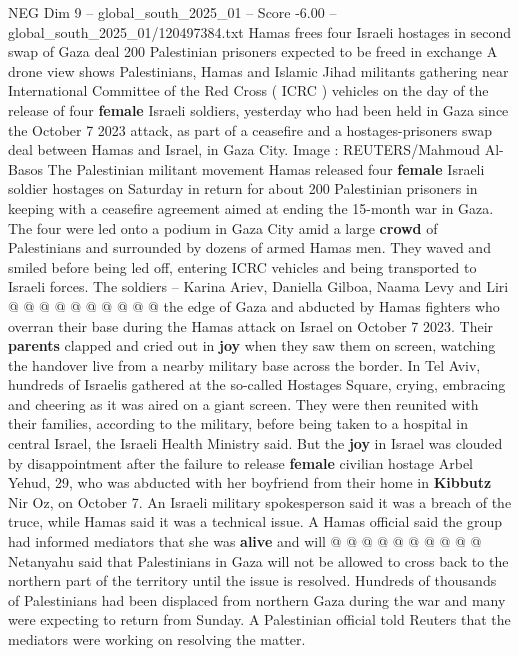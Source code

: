 \begin{textsample}{NEG Dim 9 – global\_south\_2025\_01 – Score -6.00 – global\_south\_2025\_01/120497384.txt}  \label{ex:f9_neg_140}
Hamas frees four Israeli hostages in second swap of Gaza deal 200 Palestinian prisoners expected to be freed in exchange A drone view shows Palestinians, Hamas and Islamic Jihad militants gathering near International Committee of the Red Cross ( ICRC ) vehicles on the day of the release of four \textbf{female} Israeli soldiers, yesterday who had been held in Gaza since the October 7 2023 attack, as part of a ceasefire and a hostages-prisoners swap deal between Hamas and Israel, in Gaza City.
Image : REUTERS/Mahmoud Al-Basos The Palestinian militant movement Hamas released four \textbf{female} Israeli soldier hostages on Saturday in return for about 200 Palestinian prisoners in keeping with a ceasefire agreement aimed at ending the 15-month war in Gaza.
The four were led onto a podium in Gaza City amid a large \textbf{crowd} of Palestinians and surrounded by dozens of armed Hamas men.
They waved and smiled before being led off, entering ICRC vehicles and being transported to Israeli forces.
The soldiers -- Karina Ariev, Daniella Gilboa, Naama Levy and Liri @ @ @ @ @ @ @ @ @ @ the edge of Gaza and abducted by Hamas fighters who overran their base during the Hamas attack on Israel on October 7 2023.
Their \textbf{parents} clapped and cried out in \textbf{joy} when they saw them on screen, watching the handover live from a nearby military base across the border.
In Tel Aviv, hundreds of Israelis gathered at the so-called Hostages Square, crying, embracing and cheering as it was aired on a giant screen.
They were then reunited with their families, according to the military, before being taken to a hospital in central Israel, the Israeli Health Ministry said.
But the \textbf{joy} in Israel was clouded by disappointment after the failure to release \textbf{female} civilian hostage Arbel Yehud, 29, who was abducted with her boyfriend from their home in \textbf{Kibbutz} Nir Oz, on October 7.
An Israeli military spokesperson said it was a breach of the truce, while Hamas said it was a technical issue.
A Hamas official said the group had informed mediators that she was \textbf{alive} and will @ @ @ @ @ @ @ @ @ @ Netanyahu said that Palestinians in Gaza will not be allowed to cross back to the northern part of the territory until the issue is resolved.
Hundreds of thousands of Palestinians had been displaced from northern Gaza during the war and many were expecting to return from Sunday.
A Palestinian official told Reuters that the mediators were working on resolving the matter.

\end{textsample}
